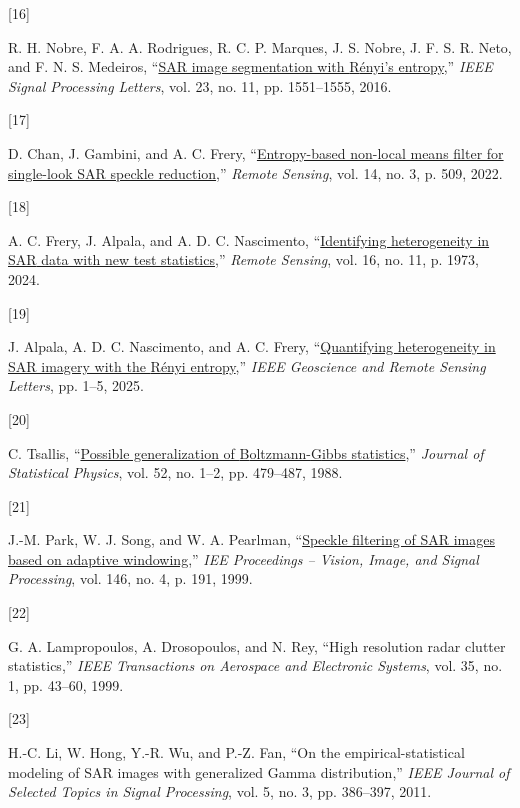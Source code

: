 \documentclass[
  lettersize  journal,
]{IEEEtran}%
\newlength{\cslhangindent}
\newlength{\csllabelwidth}
\newenvironment{CSLReferences}[2] %
 {\begin{list}{}{%
  \setlength{\itemindent}{0pt}
  \setlength{\leftmargin}{0pt}
  \setlength{\parsep}{0pt}
  \ifodd #1
   \setlength{\leftmargin}{\cslhangindent}
   \setlength{\itemindent}{-1\cslhangindent}
  \fi
  \setlength{\itemsep}{#2\baselineskip}}}
 {\end{list}}
\newcommand{\CSLLeftMargin}[1]{\parbox[t]{\csllabelwidth}{\strut#1\strut}}
\newcommand{\CSLRightInline}[1]{\parbox[t]{\linewidth - \csllabelwidth}{\strut#1\strut}}
\begin{document}
\begin{CSLReferences}{0}{0}
\CSLLeftMargin{{[}16{]} }%
\CSLRightInline{R. H. Nobre, F. A. A. Rodrigues, R. C. P. Marques, J. S.
Nobre, J. F. S. R. Neto, and F. N. S. Medeiros,
{``\href{https://doi.org/10.1109/lsp.2016.2606760}{SAR image
segmentation with {R}ényi's entropy},''} \emph{IEEE Signal Processing
Letters}, vol. 23, no. 11, pp. 1551--1555, 2016. }

\CSLLeftMargin{{[}17{]} }%
\CSLRightInline{D. Chan, J. Gambini, and A. C. Frery,
{``\href{https://doi.org/10.3390/rs14030509}{Entropy-based non-local
means filter for single-look SAR speckle reduction},''} \emph{Remote
Sensing}, vol. 14, no. 3, p. 509, 2022. }

\CSLLeftMargin{{[}18{]} }%
\CSLRightInline{A. C. Frery, J. Alpala, and A. D. C. Nascimento,
{``\href{https://doi.org/10.3390/rs16111973}{Identifying heterogeneity
in {SAR} data with new test statistics},''} \emph{Remote Sensing}, vol.
16, no. 11, p. 1973, 2024. }

\CSLLeftMargin{{[}19{]} }%
\CSLRightInline{J. Alpala, A. D. C. Nascimento, and A. C. Frery,
{``\href{https://doi.org/10.1109/lgrs.2025.3581855}{Quantifying
heterogeneity in SAR imagery with the {R}ényi entropy},''} \emph{IEEE
Geoscience and Remote Sensing Letters}, pp. 1--5, 2025. }

\CSLLeftMargin{{[}20{]} }%
\CSLRightInline{C. Tsallis,
{``\href{https://doi.org/10.1007/bf01016429}{Possible generalization of
{B}oltzmann-{G}ibbs statistics},''} \emph{Journal of Statistical
Physics}, vol. 52, no. 1--2, pp. 479--487, 1988. }

\CSLLeftMargin{{[}21{]} }%
\CSLRightInline{J.-M. Park, W. J. Song, and W. A. Pearlman,
{``\href{https://doi.org/10.1049/ip-vis:19990550}{Speckle filtering of
SAR images based on adaptive windowing},''} \emph{IEE Proceedings --
Vision, Image, and Signal Processing}, vol. 146, no. 4, p. 191, 1999. }

\CSLLeftMargin{{[}22{]} }%
\CSLRightInline{G. A. Lampropoulos, A. Drosopoulos, and N. Rey, {``High
resolution radar clutter statistics,''} \emph{IEEE Transactions on
Aerospace and Electronic Systems}, vol. 35, no. 1, pp. 43--60, 1999. }

\CSLLeftMargin{{[}23{]} }%
\CSLRightInline{H.-C. Li, W. Hong, Y.-R. Wu, and P.-Z. Fan, {``On the
empirical-statistical modeling of {SAR} images with generalized {G}amma
distribution,''} \emph{IEEE Journal of Selected Topics in Signal
Processing}, vol. 5, no. 3, pp. 386--397, 2011. }


\end{CSLReferences}
\end{document}
